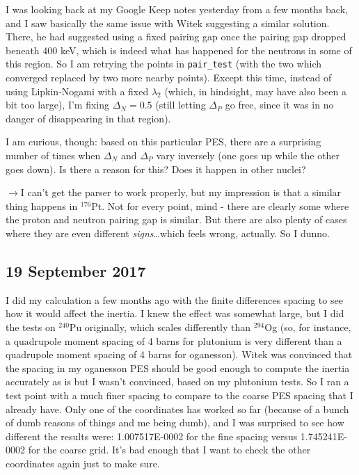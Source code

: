 \documentclass[]{report}
\begin{document}
I was looking back at my Google Keep notes yesterday from a few months back, and I saw basically the same issue with Witek suggesting a similar solution. There, he had suggested using a fixed pairing gap once the pairing gap dropped beneath 400 keV, which is indeed what has happened for the neutrons in some of this region. So I am retrying the points in \texttt{pair\_test} (with the two which converged replaced by two more nearby points). Except this time, instead of using Lipkin-Nogami with a fixed $\lambda_2$ (which, in hindsight, may have also been a bit too large), I'm fixing $\Delta_N=0.5$ (still letting $\Delta_P$ go free, since it was in no danger of disappearing in that region).

I am curious, though: based on this particular PES, there are a surprising number of times when $\Delta_N$ and $\Delta_P$ vary inversely (one goes up while the other goes down). Is there a reason for this? Does it happen in other nuclei?

\begin{adjustwidth}{1cm}{}
$\rightarrow$\quad I can't get the parser to work properly, but my impression is that a similar thing happens in $^{176}$Pt. Not for every point, mind - there are clearly some where the proton and neutron pairing gap is similar. But there are also plenty of cases where they are even different \textit{signs}\dots which feels wrong, actually. So I dunno.
\end{adjustwidth}

\subsection*{19 September 2017}
I did my calculation a few months ago with the finite differences spacing to see how it would affect the inertia. I knew the effect was somewhat large, but I did the tests on $^{240}$Pu originally, which scales differently than $^{294}$Og (so, for instance, a quadrupole moment spacing of 4 barns for plutonium is very different than a quadrupole moment spacing of 4 barns for oganesson). Witek was convinced that the spacing in my oganesson PES should be good enough to compute the inertia accurately as is but I wasn't convinced, based on my plutonium tests. So I ran a test point with a much finer spacing to compare to the coarse PES spacing that I already have. Only one of the coordinates has worked so far (because of a bunch of dumb reasons of things and me being dumb), and I was surprised to see how different the results were: 1.007517E-0002 for the fine spacing versus 1.745241E-0002 for the coarse grid. It's bad enough that I want to check the other coordinates again just to make sure.
\end{document}
